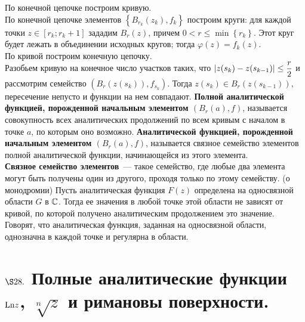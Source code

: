 \pr
По конечной цепочке построим кривую.
\\
По конечной цепочке элементов $\left\{ B_{r_k}(z_k), f_k \right\}$ построим
круги: для каждой точки $z \in [r_k; r_k+1]$ зададим $B_r(z)$, причем $0 <r \leq
\min \left\{ r_k \right\}$. Этот круг будет лежать в объединении исходных
кругов; тогда $\varphi(z) = f_k(z)$.
\\
По кривой построим конечную цепочку.
\\
Разобьем кривую на конечное число участков таких, что $\left| z(s_k) -
    z(s_{k-1}) \right|\leq \displaystyle\frac{r}{2}$ и рассмотрим семейство $\left(
    B_r(z(s_k)), f_{s_k} \right)$. Тогда $z(s_{k})\in B_r(z(s_{k-1}))$,
пересечение непусто и функции на нем совпадают.
\Def
\textbf{Полной аналитической функцией, порожденной начальным элементом $\left(
      B_r(a), f \right)$}, называется совокупность всех аналитических
продолжений по всем кривым с началом в точке $a$, по которым оно возможно.
\Def
\textbf{Аналитической функцией, порожденной начальным элементом $\left(
      B_r(a), f \right)$}, называется связное семейство элементов полной
аналитической функции, начинающейся из этого элемента.
\\
\textbf{Связное семейство элементов}~--- такое семейство, где любые два элемента
могут быть получены один из другого, проходя только по этому семейству.
\theorem (о монодромии)
Пусть аналитическая функция $F(z)$ определена на односвязной области $G$ в
$\mathbb{C}$. Тогда ее значения в любой точке этой области не зависят от кривой, по
которой получено аналитическим продолжением это значение.
\\
Говорят, что аналитическая функция, заданная на односвязной области, однозначна
в каждой точке и регулярна в области.
\section{$\S 28.$ Полные аналитические функции $\mathrm{Ln} z$, $\sqrt[n]{z}$ и римановы
  поверхности.}
